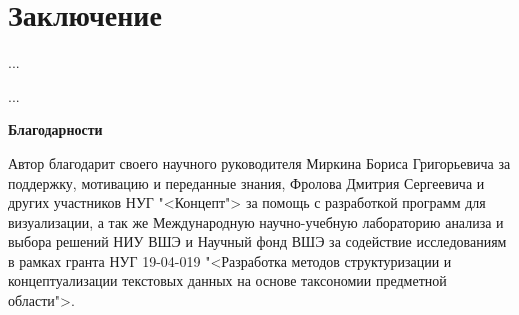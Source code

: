 \documentclass[12pt]{article}
\let\oldsection\section
\renewcommand{\section}{\clearpage\oldsection}
\begin{document}
\section{Заключение}

...

...

\noindent\textbf{Благодарности}

Автор благодарит своего научного руководителя Миркина Бориса Григорьевича за поддержку, мотивацию и переданные знания, Фролова Дмитрия Сергеевича и других участников НУГ "<Концепт"> за помощь с разработкой программ для визуализации, а так же Международную научно-учебную лабораторию анализа и выбора решений НИУ ВШЭ и Научный фонд ВШЭ за содействие исследованиям в рамках гранта НУГ 19-04-019 "<Разработка методов структуризации и концептуализации текстовых данных на основе таксономии предметной области">.
\clearpage
\nocite{*}
 


\clearpage\appendix
\end{document}
